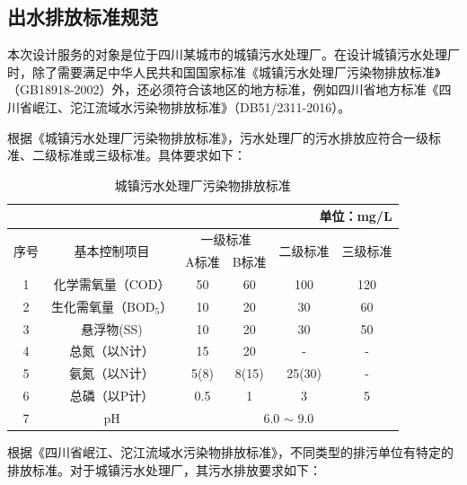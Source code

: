 \subsection{出水排放标准规范}
本次设计服务的对象是位于四川某城市的城镇污水处理厂。在设计城镇污水处理厂时，除了需要满足中华人民共和国国家标准《城镇污水处理厂污染物排放标准》（GB18918-2002）外，还必须符合该地区的地方标准，例如四川省地方标准《四川省岷江、沱江流域水污染物排放标准》（DB51/2311-2016）。

根据《城镇污水处理厂污染物排放标准》，污水处理厂的污水排放应符合一级标准、二级标准或三级标准。具体要求如下：
\begin{table}[H]
	\centering
	\caption{城镇污水处理厂污染物排放标准\cite{GB189182002}}
	\begin{tabular}{cccccc}
	\multicolumn{6}{r}{单位：mg/L} \\
	\toprule
	\multirow{2}[4]{*}{序号} & \multirow{2}[4]{*}{基本控制项目} & \multicolumn{2}{c}{一级标准} & \multirow{2}[4]{*}{二级标准} & \multirow{2}[4]{*}{三级标准} \\
	\cmidrule{3-4}          &       & A标准   & B标准   &       &  \\
	\midrule
	1     & 化学需氧量（COD） & 50    & 60    & 100   & 120 \\
	2     & 生化需氧量（BOD$_5$） & 10    & 20    & 30    & 60 \\
	3     & 悬浮物(SS) & 10    & 20    & 30    & 50 \\
	4     & 总氮（以N计） & 15    & 20    & -     & - \\
	5     & 氨氮（以N计）\footnotemark & 5(8)  & 8(15) & 25(30) & - \\
	6     & 总磷（以P计） & 0.5   & 1     & 3     & 5 \\
	7     & pH    & \multicolumn{4}{c}{6.0 $\sim$ 9.0} \\
	\bottomrule
	\end{tabular}
	\label{tab:Pollutant discharge standards for urban sewage treatment plants}%
\end{table}%

根据《四川省岷江、沱江流域水污染物排放标准》，不同类型的排污单位有特定的排放标准。对于城镇污水处理厂，其污水排放要求如下：

